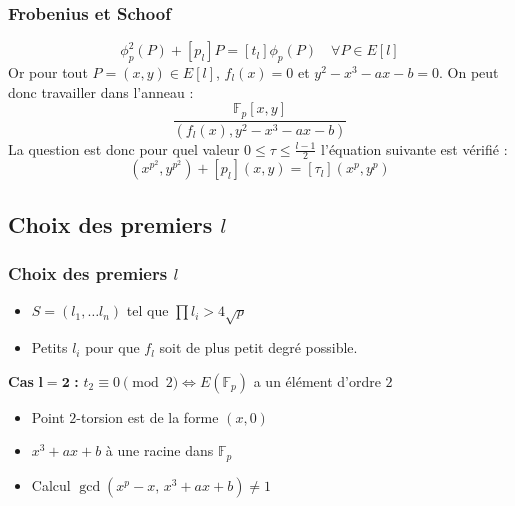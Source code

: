 \documentclass{beamer}
\begin{document}
\begin{frame}
\frametitle{Frobenius et Schoof}
\begin{equation}
\label{eqnfrobenius}
\phi_p^2(P)  + [p_l]P = [t_{l}] \phi_p(P) \quad \forall P \in E[l]
\end{equation} 
Or pour tout $P=(x,y) \in E[l]$, $f_l(x) = 0$ et $y^2 - x^3 -ax -b=0$. 
\newline
On peut donc travailler dans l'anneau : 
$$ \frac{\mathbb{F}_p[x,y]}{(f_l(x), y^2 - x^3 -ax -b)} $$ 
La question est donc pour quel valeur $0 \leq \tau \leq \frac{l-1}{2}$ l'équation suivante est vérifié :
\begin{equation}
(x^{p^2}, y^{p^2}) + [p_l](x,y) = [\tau_l](x^{p}, y^{p})
\end{equation}
\end{frame}

\subsection{Choix des premiers $l$}
\begin{frame}
\frametitle{Choix des premiers $l$}
\begin{itemize}
\item $S = (l_1, \ldots l_n)$ tel que $\prod l_i > 4\sqrt{p}$
\item Petits $l_i$ pour que $f_l$ soit de plus petit degré possible.
\end{itemize}

 
\textbf{Cas} $\mathbf{l=2}$ \textbf{:} $t_2 \equiv 0 \pmod 2 \Leftrightarrow E(\mathbb{F}_p)$ a un élément d'ordre $2$
\begin{itemize}
\item Point $2$-torsion est de la forme $(x,0)$
\item $x^3 +ax +b$ à une racine dans $\mathbb{F}_p$
\item Calcul $\gcd(x^p - x,\, x^3 +ax +b) \ne 1$
\end{itemize}
\end{frame}
\end{document}
